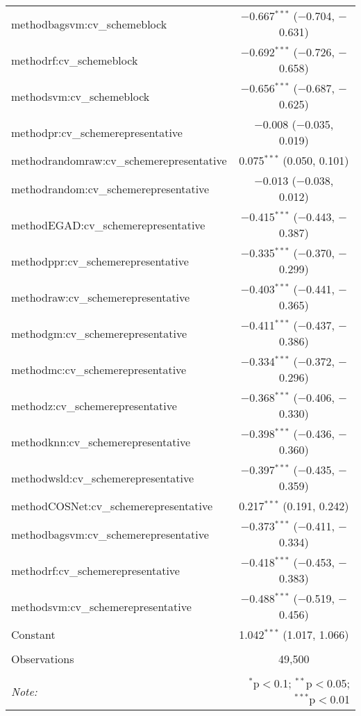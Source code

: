 \begin{table}[!htbp]
\begin{tabular}{@{\extracolsep{5pt}}lc}
  methodbagsvm:cv\_schemeblock & $-$0.667$^{***}$ ($-$0.704, $-$0.631) \\ 
  methodrf:cv\_schemeblock & $-$0.692$^{***}$ ($-$0.726, $-$0.658) \\ 
  methodsvm:cv\_schemeblock & $-$0.656$^{***}$ ($-$0.687, $-$0.625) \\ 
  methodpr:cv\_schemerepresentative & $-$0.008 ($-$0.035, 0.019) \\ 
  methodrandomraw:cv\_schemerepresentative & 0.075$^{***}$ (0.050, 0.101) \\ 
  methodrandom:cv\_schemerepresentative & $-$0.013 ($-$0.038, 0.012) \\ 
  methodEGAD:cv\_schemerepresentative & $-$0.415$^{***}$ ($-$0.443, $-$0.387) \\ 
  methodppr:cv\_schemerepresentative & $-$0.335$^{***}$ ($-$0.370, $-$0.299) \\ 
  methodraw:cv\_schemerepresentative & $-$0.403$^{***}$ ($-$0.441, $-$0.365) \\ 
  methodgm:cv\_schemerepresentative & $-$0.411$^{***}$ ($-$0.437, $-$0.386) \\ 
  methodmc:cv\_schemerepresentative & $-$0.334$^{***}$ ($-$0.372, $-$0.296) \\ 
  methodz:cv\_schemerepresentative & $-$0.368$^{***}$ ($-$0.406, $-$0.330) \\ 
  methodknn:cv\_schemerepresentative & $-$0.398$^{***}$ ($-$0.436, $-$0.360) \\ 
  methodwsld:cv\_schemerepresentative & $-$0.397$^{***}$ ($-$0.435, $-$0.359) \\ 
  methodCOSNet:cv\_schemerepresentative & 0.217$^{***}$ (0.191, 0.242) \\ 
  methodbagsvm:cv\_schemerepresentative & $-$0.373$^{***}$ ($-$0.411, $-$0.334) \\ 
  methodrf:cv\_schemerepresentative & $-$0.418$^{***}$ ($-$0.453, $-$0.383) \\ 
  methodsvm:cv\_schemerepresentative & $-$0.488$^{***}$ ($-$0.519, $-$0.456) \\ 
  Constant & 1.042$^{***}$ (1.017, 1.066) \\ 
 \hline \\[-1.8ex] 
Observations & 49,500 \\ 
\hline 
\hline \\[-1.8ex] 
\textit{Note:}  & \multicolumn{1}{r}{$^{*}$p$<$0.1; $^{**}$p$<$0.05; $^{***}$p$<$0.01} \\ 
\end{tabular} 
\end{table} 
